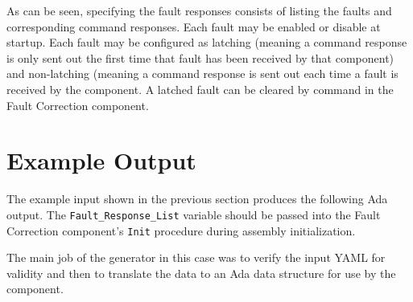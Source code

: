 
As can be seen, specifying the fault responses consists of listing the faults and corresponding command responses. Each fault may be enabled or disable at startup. Each fault may be configured as latching (meaning a command response is only sent out the first time that fault has been received by that component) and non-latching (meaning a command response is sent out each time a fault is received by the component. A latched fault can be cleared by command in the Fault Correction component.

\section{Example Output}

The example input shown in the previous section produces the following Ada output. The \texttt{Fault\_Response\_List} variable should be passed into the Fault Correction component's \texttt{Init} procedure during assembly initialization.

The main job of the generator in this case was to verify the input YAML for validity and then to translate the data to an Ada data structure for use by the component.



